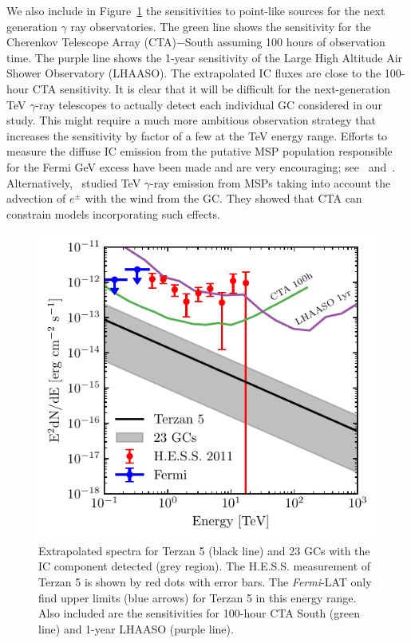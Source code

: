 \documentclass[doublespace,draft,nopageskip]{VTthesis} %
\begin{document}
We also include in Figure~\ref{fig:TeV} the sensitivities to point-like sources for the next generation $\gamma$ ray observatories. The green line shows the sensitivity for the Cherenkov Telescope Array (CTA)$-$South assuming 100 hours of observation time. The purple line shows the 1-year sensitivity of the Large High Altitude Air Shower Observatory (LHAASO). The extrapolated IC fluxes are close to the 100-hour CTA sensitivity. It is clear that it will be difficult for the next-generation TeV $\gamma$-ray telescopes to actually detect each individual GC considered in our study. This might require a much more ambitious observation strategy that increases the sensitivity by factor of a few at the TeV energy range.  Efforts to measure the diffuse IC emission from the putative MSP population responsible for the Fermi GeV excess have been made and are very encouraging; see~\citet{2019PhRvD..99l3020S} and~\citet{2021arXiv210205648M}. Alternatively,~\citet{2016MNRAS.458.1083B} studied TeV $\gamma$-ray emission from MSPs taking into account the advection of $e^\pm$ with the wind from the GC. They showed that CTA can constrain models incorporating such effects. 

\begin{figure}
    \centering
    \includegraphics{Figures/Globular/TeV.pdf}
    \caption{Extrapolated spectra for Terzan 5 (black line) and 23 GCs with the IC component detected (grey region). The H.E.S.S. measurement of Terzan 5 is shown by red dots with error bars. The {\it Fermi}-LAT only find upper limits (blue arrows) for Terzan 5 in this energy range. Also included are the sensitivities for 100-hour CTA South (green line) and 1-year LHAASO (purple line).}
    \label{fig:TeV}
\end{figure}
\end{document}
